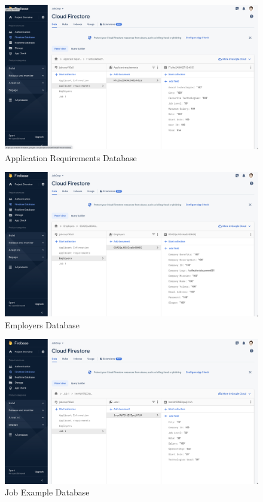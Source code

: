 \begin{figure}
    \centering
    \includegraphics[width = 140mm]{Figures/app-reqs.png}
    \caption{Application Requirements Database}
    \label{fig: app-reqs}
\end{figure}

\begin{figure}
    \centering
    \includegraphics[width = 140mm]{Figures/employers.png}
    \caption{Employers Database}
    \label{fig: employers}
\end{figure}

\begin{figure}
    \centering
    \includegraphics[width = 140mm]{Figures/job-1.png}
    \caption{Job Example Database}
    \label{fig: job-1}
\end{figure}

